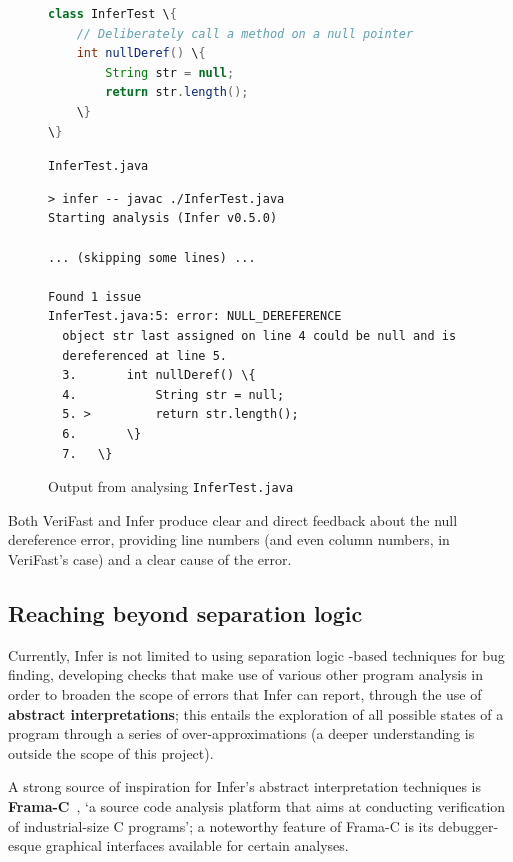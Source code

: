 \begin{figure}
    \centering
    \begin{lstlisting}[language=Java,
        style=code,
        xleftmargin=0.2\textwidth,
        xrightmargin=0.2\textwidth]
class InferTest \{
    // Deliberately call a method on a null pointer
    int nullDeref() \{
        String str = null;
        return str.length();
    \}
\}
    \end{lstlisting}
    \caption{\texttt{InferTest.java}}
    \label{fig:infer-example}
\end{figure}

\begin{figure}
    \centering
    \begin{lstlisting}[style=terminal,
        xleftmargin=0.05\textwidth,
        xrightmargin=0.05\textwidth]
> infer -- javac ./InferTest.java
Starting analysis (Infer v0.5.0)

... (skipping some lines) ...

Found 1 issue
InferTest.java:5: error: NULL_DEREFERENCE
  object str last assigned on line 4 could be null and is
  dereferenced at line 5.
  3.       int nullDeref() \{
  4.           String str = null;
  5. >         return str.length();
  6.       \}
  7.   \}
    \end{lstlisting}
    \caption{Output from analysing \texttt{InferTest.java}}
    \label{fig:infer-example-output}
\end{figure}

Both VeriFast and Infer produce clear and direct feedback about the null
dereference error, providing line numbers (and even column numbers, in
VeriFast's case) and a clear cause of the error.

\subsection{Reaching beyond separation logic}

Currently, Infer is not limited to using separation logic -based techniques for
bug finding, developing checks that make use of various other program analysis
in order to broaden the scope of errors that Infer can report, through the use
of \textbf{abstract interpretations}; this entails the exploration of all
possible states of a program through a series of over-approximations (a deeper
understanding is outside the scope of this project).

A strong source of inspiration for Infer's abstract interpretation techniques is
\textbf{Frama-C}~\cite{frama-c-paper, frama-c-site}, `a source code analysis
platform that aims at conducting verification of industrial-size C programs'; a
noteworthy feature of Frama-C is its debugger-esque graphical interfaces
available for certain analyses.


